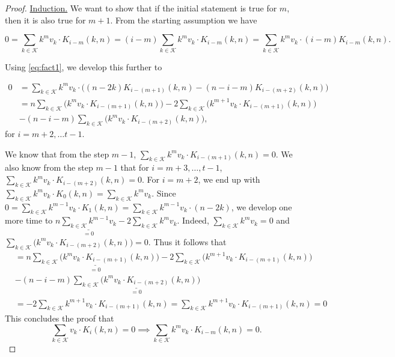 \begin{proof}
    \underline{Induction.} We want to show that if the initial statement is true for $m$, then it is also true for $m+1$. From the starting assumption we have

    $$
    0 = \sum_{k \in \mathcal{K}} k^mv_k \cdot K_{i-m}(k, n) = (i-m)\sum_{k \in \mathcal{K}} k^mv_k \cdot K_{i-m}(k, n) = \sum_{k \in \mathcal{K}} k^mv_k \cdot (i-m)K_{i-m}(k, n).
    $$

    Using \cref{eq:fact1}, we develop this further to

    \begin{equation*}
    \begin{split}
        0 &= \sum_{k \in \mathcal{K}} k^mv_k \cdot \Big( (n - 2k)K_{i - (m+1)}(k, n) - (n - i - m)K_{i - (m + 2)}(k, n) \Big)\\
        & = n \sum_{k \in \mathcal{K}} \Big( k^mv_k \cdot K_{i - (m+1)}(k, n) \Big) - 2\sum_{k \in \mathcal{K}} \Big( k^{m+1}v_k \cdot K_{i - (m+1)}(k, n) \Big)\\& - (n - i - m)\sum_{k \in \mathcal{K}} \Big( k^mv_k \cdot K_{i - (m+2)}(k, n) \Big),
    \end{split}
    \end{equation*}
    for $i = m+2, \ldots t-1$.

    We know that from the step $m-1$, $\sum_{k \in \mathcal{K}} k^mv_k \cdot K_{i - (m+1)}(k, n) = 0$. We also know from the step $m-1$ that for $i = m+3, \ldots, t-1$, $\sum_{k \in \mathcal{K}} k^mv_k \cdot K_{i - (m+2)}(k, n) = 0$. For $i = m + 2$, we end up with $\sum_{k \in \mathcal{K}} k^mv_k \cdot K_0(k, n) = \sum_{k \in \mathcal{K}} k^mv_k$. Since $0 = \sum_{k \in \mathcal{K}} k^{m-1}v_k \cdot K_1(k, n) = \sum_{k \in \mathcal{K}} k^{m-1}v_k \cdot (n - 2k)$, we develop one more time to $n\underset{=0}{\underline{\sum_{k \in \mathcal{K}} k^{m-1}v_k}} - 2\sum_{k \in \mathcal{K}}k^mv_k$. Indeed, $\sum_{k \in \mathcal{K}}k^mv_k = 0$ and $\sum_{k \in \mathcal{K}} \Big( k^mv_k \cdot K_{i - (m+2)}(k, n) \Big) = 0$. Thus it follows that
    \begin{equation*}
    \begin{split}
        & = n \underset{=0}{\underline{\sum_{k \in \mathcal{K}} \Big( k^mv_k \cdot K_{i - (m+1)}(k, n) \Big)}} - 2\sum_{k \in \mathcal{K}} \Big( k^{m+1}v_k \cdot K_{i - (m+1)}(k, n) \Big)\\& - (n - i - m)\underset{=0}{\underline{\sum_{k \in \mathcal{K}} \Big( k^mv_k \cdot K_{i - (m+2)}(k, n) \Big)}}\\
        &= -2\sum_{k \in \mathcal{K}} k^{m+1}v_k \cdot K_{i - (m+1)}(k, n) = \sum_{k \in \mathcal{K}} k^{m+1}v_k \cdot K_{i - (m+1)}(k, n) = 0
    \end{split}
    \end{equation*}
    This concludes the proof that
    $$\sum_{k \in \mathcal{K}} v_k \cdot K_i(k, n) = 0 \implies \sum_{k \in \mathcal{K}} k^mv_k \cdot K_{i-m}(k, n) = 0.$$
\end{proof}


